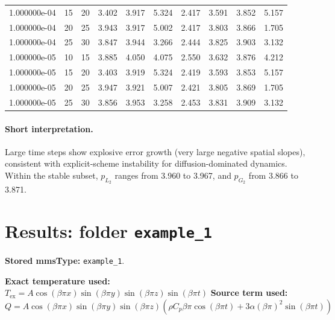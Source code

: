 \documentclass[11pt,a4paper]{article}
\begin{document}
\begin{table}[htbp]
{\begin{tabular}{cccccccccc}
1.000000e-04 & 15 & 20 & 3.402 & 3.917 & 5.324 & 2.417 & 3.591 & 3.852 & 5.157 \\
1.000000e-04 & 20 & 25 & 3.943 & 3.917 & 5.002 & 2.417 & 3.803 & 3.866 & 1.705 \\
1.000000e-04 & 25 & 30 & 3.847 & 3.944 & 3.266 & 2.444 & 3.825 & 3.903 & 3.132 \\
1.000000e-05 & 10 & 15 & 3.885 & 4.050 & 4.075 & 2.550 & 3.632 & 3.876 & 4.212 \\
1.000000e-05 & 15 & 20 & 3.403 & 3.919 & 5.324 & 2.419 & 3.593 & 3.853 & 5.157 \\
1.000000e-05 & 20 & 25 & 3.947 & 3.921 & 5.007 & 2.421 & 3.805 & 3.869 & 1.705 \\
1.000000e-05 & 25 & 30 & 3.856 & 3.953 & 3.258 & 2.453 & 3.831 & 3.909 & 3.132 \\
\bottomrule
\end{tabular}%
}
\end{table}
\paragraph{Short interpretation.}
Large time steps show explosive error growth (very large negative spatial slopes), consistent with explicit-scheme instability for diffusion-dominated dynamics. Within the stable subset, $p_{L_2}$ ranges from 3.960 to 3.967, and $p_{G_2}$ from 3.866 to 3.871.
\section{Results: folder \texttt{example\_1}}
\textbf{Stored mmsType:} \texttt{example\_1}.

\textbf{Exact temperature used:} $T_{\mathrm{ex}} = A\cos(\beta\pi x)\sin(\beta\pi y)\sin(\beta\pi z)\sin(\beta\pi t)$
\textbf{Source term used:} $Q = A\cos(\beta\pi x)\sin(\beta\pi y)\sin(\beta\pi z)\left(\rho C_p\beta\pi\cos(\beta\pi t) + 3\alpha(\beta\pi)^2\sin(\beta\pi t)\right)$
\end{document}
